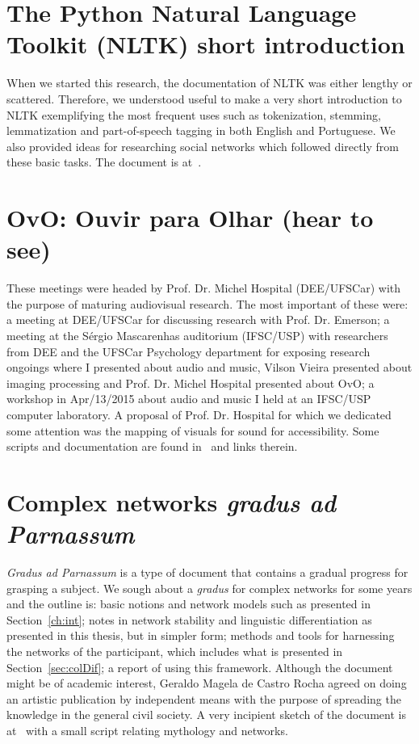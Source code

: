 \begin{apendicesenv}
\section{The Python Natural Language Toolkit (NLTK) short introduction}
When we started this research, the documentation of NLTK was either lengthy or
scattered.
Therefore, we understood useful to make a very short introduction to NLTK
exemplifying the most frequent uses such as tokenization, stemming, lemmatization and
part-of-speech tagging in both English and Portuguese.
We also provided ideas for researching social networks which followed directly from
these basic tasks.
The document is at~\cite{trabNLTK}.


\section{OvO: Ouvir para Olhar (hear to see)}
These meetings were headed by Prof. Dr. Michel Hospital (DEE/UFSCar)
with the purpose of maturing audiovisual research.
The most important of these were: a meeting at DEE/UFSCar for discussing research with Prof. Dr. Emerson;
a meeting at the Sérgio Mascarenhas auditorium (IFSC/USP) with researchers from DEE and the UFSCar Psychology department
for exposing research ongoings where I presented about audio and music, Vilson Vieira presented about imaging processing
and Prof. Dr. Michel Hospital presented about OvO;
a workshop in Apr/13/2015 about audio and music I held at an IFSC/USP computer laboratory.
A proposal of Prof. Dr. Hospital for which we dedicated some attention was the
mapping of visuals for sound for accessibility.
Some scripts and documentation are found in~\cite{ovo} and links therein.

\section{Complex networks \emph{gradus ad Parnassum}}
\emph{Gradus ad Parnassum} is a type of document that contains a gradual progress for grasping a subject.
We sough about a \emph{gradus} for complex networks for some years and the outline is:
basic notions and network models such as presented in Section~\ref{ch:int};
notes in network stability and linguistic differentiation as presented in this thesis, but in simpler form;
methods and tools for harnessing the networks of the participant, which includes what is presented in Section~\ref{sec:colDif};
a report of using this framework.
Although the document might be of academic interest,
Geraldo Magela de Castro Rocha agreed on doing an artistic publication by independent means
with the purpose of spreading the knowledge in the general civil society.
A very incipient sketch of the document is at~\cite{gradus}
with a small script relating mythology and networks.


\end{apendicesenv}
